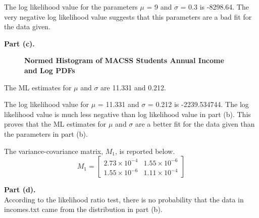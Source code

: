 \documentclass[letterpaper,12pt]{article}
\theoremstyle{definition}
\begin{document}
\flushleft The log likelihood value for the parameters $\mu$ = 9 and $\sigma$ = 0.3 is -8298.64. The very negative log likelihood value suggests that this parameters are a bad fit for the data given. 
\flushleft

\textbf{Part (c).} \\
\begin{figure}[htb]\centering\captionsetup{width=4.0in}
  \caption{\textbf{Normed Histogram of MACSS Students Annual Income and Log PDFs}}\label{FigExample}
\end{figure}
\flushleft 
The ML estimates for $\mu$ and $\sigma$ are 11.331 and 0.212. 

\flushleft 
The log likelihood value for $\mu$ = 11.331 and $\sigma$ = 0.212 is -2239.534744. The log likelihood value is much less negative than log likelihood value in part (b). This proves that the ML estimates for $\mu$ and $\sigma$ are a better fit for the data given than the parameters in part (b).

\flushleft 
The variance-covariance matrix, $M_1$, is reported below. 
\[
M_1 =
  \begin{bmatrix}
    2.73\times 10^{-4} &  1.55\times10^{-6}  \\
    1.55\times 10^{-6} &  1.11\times10^{-4} 
  \end{bmatrix}
\]

\flushleft

\pagebreak
\textbf{Part (d).} \\
\flushleft 
According to the likelihood ratio test, there is no probability that the data in incomes.txt came from the distribution in part (b). 

\flushleft
\end{document}

